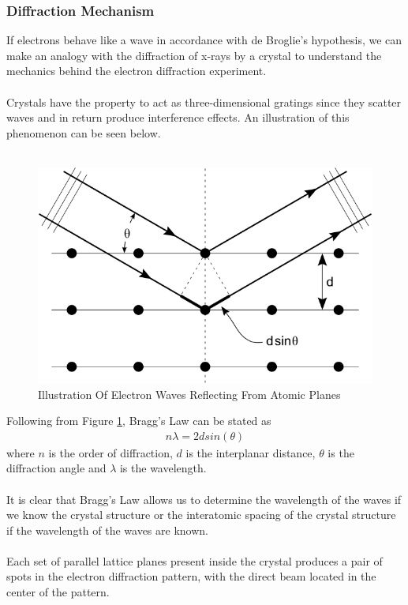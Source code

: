 		\subsubsection{Diffraction Mechanism}
			If electrons behave like a wave in accordance with de Broglie's hypothesis, we can make an analogy with the diffraction of x-rays by a crystal to understand the mechanics behind the electron diffraction experiment.
			\\
			\\
			Crystals have the property to act as three-dimensional gratings since they scatter waves and in return produce interference effects. An illustration of this phenomenon can be seen below.
			\\
			\\
			\begin{figure}[H]
				\includegraphics[width=\textwidth]{./images/bragg_diffraction.png}
				\caption{Illustration Of Electron Waves Reflecting From Atomic Planes}
				\label{fig:bragg}
			\end{figure}
			Following from Figure \ref{fig:bragg}, Bragg's Law can be stated as 
			\begin{align*}
				n \lambda = 2 d sin(\theta)
			\end{align*}
			where $n$ is the order of diffraction, $d$ is the interplanar distance, $\theta$ is the diffraction angle and $\lambda$ is the wavelength. 
			\\
			\\
			It is clear that Bragg's Law allows us to determine the wavelength of the waves if we know the crystal structure or the interatomic spacing of the crystal structure if the wavelength of the waves are known.
			\\
			\\
			Each set of parallel lattice planes present inside the crystal produces a pair of spots in the electron diffraction pattern, with the direct beam located in the center of the pattern.
		